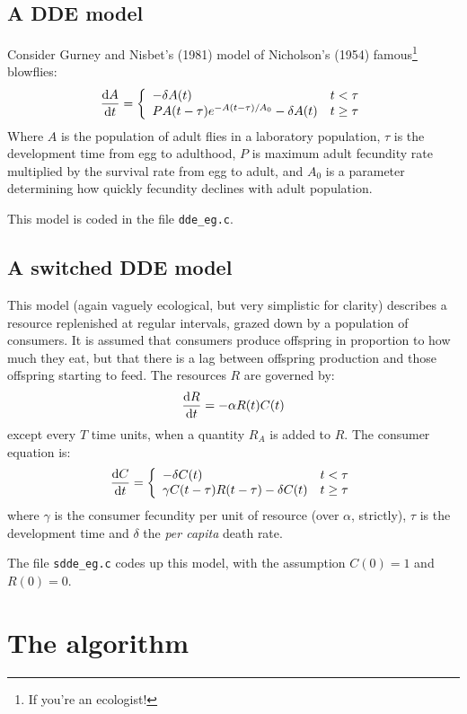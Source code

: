 \documentclass[10pt] {article}
\newcommand{\dif}[2]{\frac{{\rm d} #1}{{\rm d} #2}}
\begin{document}
\subsection{A DDE model}
Consider Gurney and Nisbet's (1981) model of Nicholson's (1954) famous\footnote{If you're an %
ecologist!} blowflies:
$$
\dif{A}{t}= \left \{ \begin{array} {lc}
- \delta A(t) & t < \tau \\
P A(t-\tau) e^{-A(t-\tau)/A_0} - \delta A(t) & t \ge \tau \end{array} \right .
$$
Where $ A $ is the population of adult flies in a laboratory population, $ \tau$ is the %
development time from egg to adulthood, $ P$ is maximum adult fecundity rate multiplied by the %
survival rate from egg to adult, and $ A_0$ is a parameter determining how quickly fecundity %
declines with adult population. 

This model is coded in the file \verb+dde_eg.c+.

\subsection{A switched DDE model}

This model (again vaguely ecological, but very simplistic for clarity) describes a resource %
replenished at regular intervals, grazed down by a population of consumers. It is assumed that %
consumers produce offspring in proportion to how much they eat, but that there is a lag between %
offspring production and those offspring starting to feed. 
The resources $ R$ are governed by:
$$
\dif{R}{t} = - \alpha R(t)C(t)
$$
except every $ T$ time units, when a quantity  $R_A$ is added to $R$. The consumer equation is:
$$
\dif{C}{t}= \left \{ \begin{array}{lc} 
- \delta C(t) & t < \tau \\
\gamma C(t-\tau)R(t-\tau) - \delta C(t) & t \ge \tau \end{array} \right . 
$$ 
where $ \gamma $ is the consumer fecundity per unit of resource (over $ \alpha$, strictly), $ %
\tau $ is the development time and $ \delta $ the {\it per capita} death rate.

The file \verb+sdde_eg.c+ codes up this model, with the assumption $ C(0)=1$ and $ R(0)=0$.

\section{The algorithm}
\end{document}
